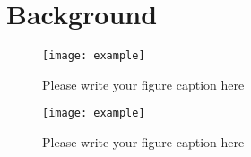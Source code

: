 \section{Background}\label{sec:background}


\begin{figure}
  \texttt{[image: example]}
\caption{Please write your figure caption here}
\label{fig:1}       %
\end{figure}
%
\begin{figure*}
  \texttt{[image: example]}
\caption{Please write your figure caption here}
\label{fig:2}       %
\end{figure*}

